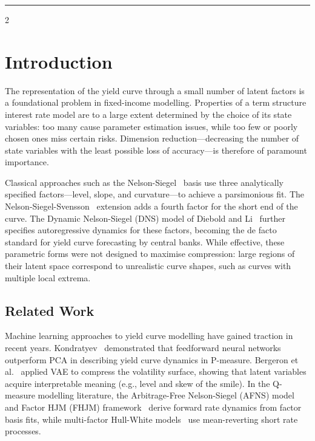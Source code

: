 \documentclass[10pt,a4paper]{article}
\theoremstyle{plain}
\theoremstyle{definition}
\begin{document}
\begin{center}
	\textcolor{bluecustom}{\rule{\linewidth}{0.5mm}}
\end{center}

\begin{multicols}{2}

\section{Introduction}

The representation of the yield curve through a small number of latent factors is a foundational problem in fixed-income modelling. Properties of a term structure interest rate model are to a large extent determined by the choice of its state variables: too many cause parameter estimation issues, while too few or poorly chosen ones miss certain risks. Dimension reduction---decreasing the number of state variables with the least possible loss of accuracy---is therefore of paramount importance.

Classical approaches such as the Nelson-Siegel~\cite{nelson1987} basis use three analytically specified factors---level, slope, and curvature---to achieve a parsimonious fit. The Nelson-Siegel-Svensson~\cite{svensson1995} extension adds a fourth factor for the short end of the curve. The Dynamic Nelson-Siegel (DNS) model of Diebold and Li~\cite{diebold2006} further specifies autoregressive dynamics for these factors, becoming the de facto standard for yield curve forecasting by central banks. While effective, these parametric forms were not designed to maximise compression: large regions of their latent space correspond to unrealistic curve shapes, such as curves with multiple local extrema.

\subsection{Related Work}

Machine learning approaches to yield curve modelling have gained traction in recent years. Kondratyev~\cite{kondratyev2018} demonstrated that feedforward neural networks outperform PCA in describing yield curve dynamics in P-measure. Bergeron et al.~\cite{bergeron2022} applied VAE to compress the volatility surface, showing that latent variables acquire interpretable meaning (e.g., level and skew of the smile). In the Q-measure modelling literature, the Arbitrage-Free Nelson-Siegel (AFNS) model~\cite{christensen2009} and Factor HJM (FHJM) framework~\cite{lyashenko2021} derive forward rate dynamics from factor basis fits, while multi-factor Hull-White models~\cite{hull1994,brigo2006} use mean-reverting short rate processes.


\end{multicols}
\end{document}
